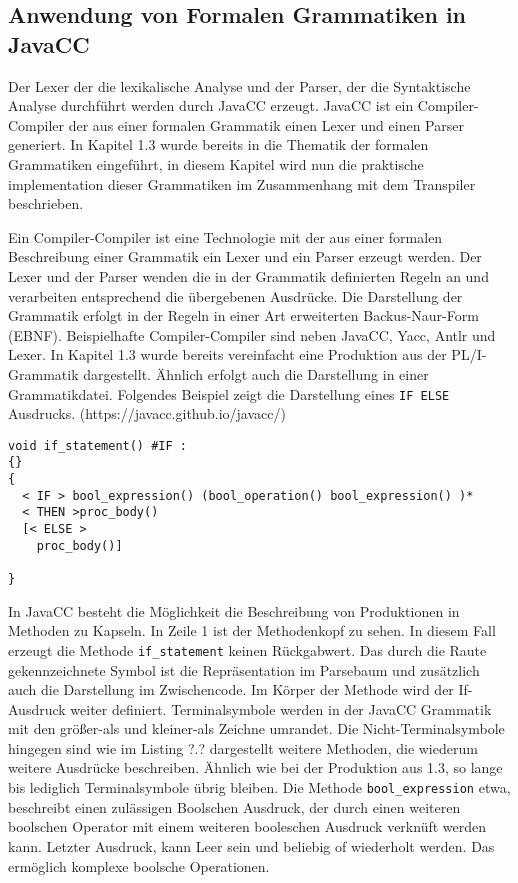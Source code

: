 \subsection{Anwendung von Formalen Grammatiken in JavaCC}

Der Lexer der die lexikalische Analyse und der Parser, der die Syntaktische Analyse durchführt werden durch JavaCC erzeugt. 
JavaCC ist ein Compiler-Compiler der aus einer formalen Grammatik einen Lexer und einen Parser generiert. 
In Kapitel 1.3 wurde bereits in die Thematik der formalen Grammatiken eingeführt, in diesem Kapitel wird nun die praktische implementation dieser Grammatiken im Zusammenhang mit dem Transpiler beschrieben.

Ein Compiler-Compiler ist eine Technologie mit der aus einer formalen Beschreibung einer Grammatik ein Lexer und ein Parser erzeugt werden. 
Der Lexer und der Parser wenden die in der Grammatik definierten Regeln an und verarbeiten entsprechend die übergebenen Ausdrücke.
Die Darstellung der Grammatik erfolgt in der Regeln in einer Art erweiterten Backus-Naur-Form (EBNF). 
Beispielhafte Compiler-Compiler sind neben JavaCC, Yacc, Antlr und Lexer.
In Kapitel 1.3 wurde bereits vereinfacht eine Produktion aus der PL/I-Grammatik dargestellt. Ähnlich erfolgt auch die Darstellung in einer Grammatikdatei. Folgendes Beispiel zeigt die Darstellung eines \verb+IF ELSE+ Ausdrucks. 
(https://javacc.github.io/javacc/)

\begin{verbatim}
void if_statement() #IF :
{}
{
  < IF > bool_expression() (bool_operation() bool_expression() )*
  < THEN >proc_body()
  [< ELSE >
  	proc_body()]
  	
}
\end{verbatim}

In JavaCC besteht die Möglichkeit die Beschreibung von Produktionen in Methoden zu Kapseln.
In Zeile 1 ist der Methodenkopf zu sehen. In diesem Fall erzeugt die Methode \verb+if_statement+ keinen Rückgabwert.
Das durch die Raute gekennzeichnete Symbol ist die Repräsentation im Parsebaum und zusätzlich auch die Darstellung im Zwischencode.
Im Körper der Methode wird der If-Ausdruck weiter definiert. Terminalsymbole werden in der JavaCC Grammatik mit den größer-als und kleiner-als Zeichne umrandet. Die Nicht-Terminalsymbole hingegen sind wie im Listing ?.? dargestellt weitere Methoden, die wiederum weitere Ausdrücke beschreiben.
Ähnlich wie bei der Produktion aus 1.3, so lange bis lediglich Terminalsymbole übrig bleiben.
Die Methode \verb+bool_expression+ etwa, beschreibt einen zulässigen Boolschen Ausdruck, der durch einen weiteren boolschen Operator mit einem weiteren booleschen Ausdruck verknüft werden kann.
Letzter Ausdruck, kann Leer sein und beliebig of wiederholt werden. Das ermöglich komplexe boolsche Operationen.

